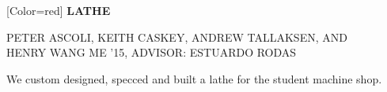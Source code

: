 \documentclass{article}
\begin{document}
{
	[Color=red]
	\fontsize{1in}{0.9in}\selectfont 
	\bfseries
	\noindent
	LATHE
}

\vspace{0.25in}

{
	\fontsize{0.55in}{0.6in}\selectfont
	\noindent
	PETER ASCOLI, KEITH CASKEY, ANDREW TALLAKSEN, {
	\fontsize{0.4in}{0.4in}\selectfont AND} \\ HENRY WANG
}
{
	\fontsize{0.4in}{0.4in}\selectfont
	ME '15, ADVISOR: ESTUARDO RODAS
}

\vspace{0.2in}

{
	\fontsize{0.4in}{0.4in}\selectfont
	\noindent
	We custom designed, specced and built a lathe for the student machine shop. 
}
\end{document}
